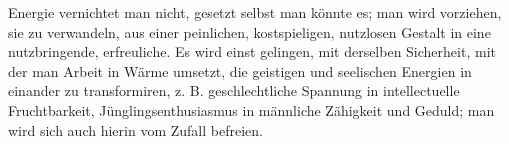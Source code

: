Energie vernichtet man nicht, gesetzt selbst man könnte es; man wird vorziehen, sie zu verwandeln, aus einer peinlichen, kostspieligen, nutzlosen Gestalt in eine nutzbringende, erfreuliche. Es wird einst gelingen, mit derselben Sicherheit, mit der man Arbeit in Wärme umsetzt, die geistigen und seelischen Energien in einander zu transformiren, z. B. geschlechtliche Spannung in intellectuelle Fruchtbarkeit, Jünglingsenthusiasmus in männliche Zähigkeit und Geduld; man wird sich auch hierin vom Zufall befreien.
\par

